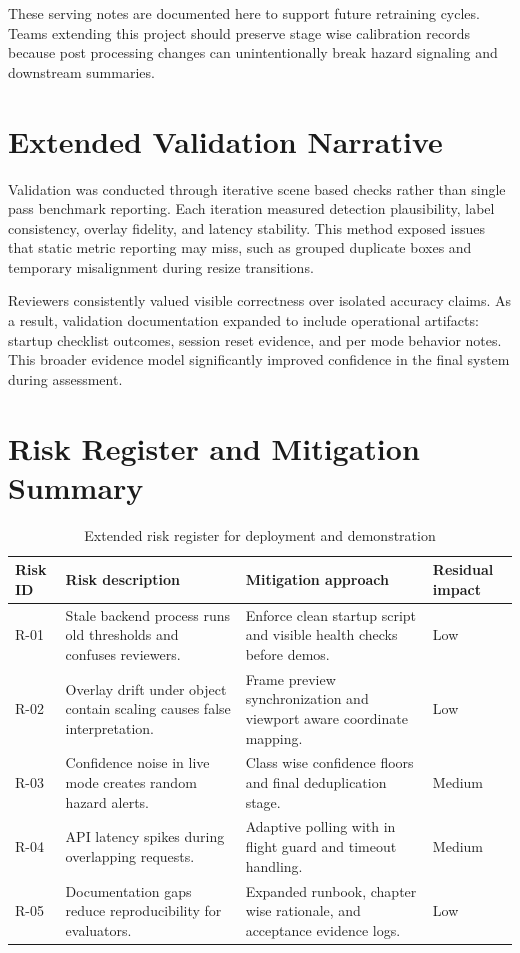 \documentclass[12pt,a4paper]{report}
\begin{document}
These serving notes are documented here to support future retraining cycles. Teams extending this project should preserve stage wise calibration records because post processing changes can unintentionally break hazard signaling and downstream summaries.

\section{Extended Validation Narrative}
Validation was conducted through iterative scene based checks rather than single pass benchmark reporting. Each iteration measured detection plausibility, label consistency, overlay fidelity, and latency stability. This method exposed issues that static metric reporting may miss, such as grouped duplicate boxes and temporary misalignment during resize transitions.

Reviewers consistently valued visible correctness over isolated accuracy claims. As a result, validation documentation expanded to include operational artifacts: startup checklist outcomes, session reset evidence, and per mode behavior notes. This broader evidence model significantly improved confidence in the final system during assessment.

\section{Risk Register and Mitigation Summary}
\begin{table}[H]
    \centering
    \caption{Extended risk register for deployment and demonstration}
    \begin{tabularx}{\textwidth}{|p{}|X|X|X|}
        \hline
        Risk ID & Risk description & Mitigation approach & Residual impact \\
        \hline
        R-01 & Stale backend process runs old thresholds and confuses reviewers. & Enforce clean startup script and visible health checks before demos. & Low \\
        \hline
        R-02 & Overlay drift under object contain scaling causes false interpretation. & Frame preview synchronization and viewport aware coordinate mapping. & Low \\
        \hline
        R-03 & Confidence noise in live mode creates random hazard alerts. & Class wise confidence floors and final deduplication stage. & Medium \\
        \hline
        R-04 & API latency spikes during overlapping requests. & Adaptive polling with in flight guard and timeout handling. & Medium \\
        \hline
        R-05 & Documentation gaps reduce reproducibility for evaluators. & Expanded runbook, chapter wise rationale, and acceptance evidence logs. & Low \\
        \hline
    \end{tabularx}
\end{table}
\end{document}
